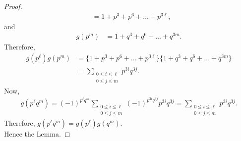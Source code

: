 \documentclass[10pt,a4paper]{amsart}
\begin{document}
\begin{proof}
\begin{align*}
		&=1+p^{3}+p^{6}+\dots+p^{3\ell},
	\end{align*}
	and 
	\begin{align*}
		g(p^{m})&=1+q^{3}+q^{6}+\dots+q^{3m}.
	\end{align*}
	Therefore,
	\begin{align*}
		g(p^{\ell})g(p^{m})&=\{1+p^{3}+p^{6}+\dots+p^{3\ell}\}\{1+q^{3}+q^{6}+\dots+q^{3m}\}\\
		&=\sum\limits_{\substack{0\leq i\leq \ell \\ 0\leq j \leq m}} p^{3i}q^{3j}.
	\end{align*}
	Now, 
	\begin{align*}
		g(p^{\ell}q^{m})=(-1)^{p^{\ell}q^{m}}\sum\limits_{\substack{0\leq i\leq \ell \\ 0\leq j \leq m}}(-1)^{p^{3i}q^{3j}} p^{3i}q^{3j}=\sum\limits_{\substack{0\leq i\leq \ell \\ 0\leq j \leq m}} p^{3i}q^{3j}.
	\end{align*}
	Therefore,
	$g(p^{\ell}q^{m})=g(p^{\ell})g(q^{m})$.\\
	Hence the Lemma.
\end{proof}
\end{document}

